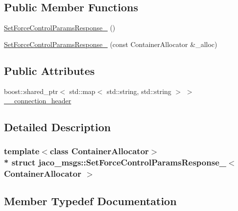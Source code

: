 \subsection*{Public Member Functions}
\begin{DoxyCompactItemize}
\item 
\hyperlink{structjaco__msgs_1_1SetForceControlParamsResponse___af5c22ddf148e525b6c34b08a86cb53b4}{Set\+Force\+Control\+Params\+Response\+\_\+} ()
\item 
\hyperlink{structjaco__msgs_1_1SetForceControlParamsResponse___ac6265756ad349dff863e238bcac5c168}{Set\+Force\+Control\+Params\+Response\+\_\+} (const Container\+Allocator \&\+\_\+alloc)
\end{DoxyCompactItemize}
\subsection*{Public Attributes}
\begin{DoxyCompactItemize}
\item 
boost\+::shared\+\_\+ptr$<$ std\+::map$<$ std\+::string, std\+::string $>$ $>$ \hyperlink{structjaco__msgs_1_1SetForceControlParamsResponse___a76f459bbfdbbe1d78a055c10f2581658}{\+\_\+\+\_\+connection\+\_\+header}
\end{DoxyCompactItemize}


\subsection{Detailed Description}
\subsubsection*{template$<$class Container\+Allocator$>$\\*
struct jaco\+\_\+msgs\+::\+Set\+Force\+Control\+Params\+Response\+\_\+$<$ Container\+Allocator $>$}



\subsection{Member Typedef Documentation}
